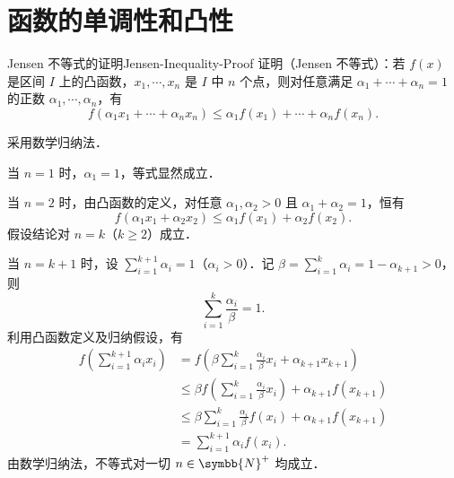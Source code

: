 \section{函数的单调性和凸性}

\begin{problem}{Jensen 不等式的证明}{Jensen-Inequality-Proof}
    证明（Jensen 不等式）：若 $f(x)$ 是区间 $I$ 上的凸函数，$x_1, \cdots, x_n$ 是 $I$ 中 $n$ 个点，则对任意满足 $\alpha_1 + \cdots + \alpha_n = 1$ 的正数 $\alpha_1, \cdots, \alpha_n$，有
    \begin{equation}
        f(\alpha_1 x_1 + \cdots + \alpha_n x_n) \leqslant \alpha_1 f(x_1) + \cdots + \alpha_n f(x_n).
    \end{equation}
\end{problem}

\begin{myproof}
    采用数学归纳法．

    当 $n = 1$ 时，$\alpha_1 = 1$，等式显然成立．

    当 $n = 2$ 时，由凸函数的定义，对任意 $\alpha_1, \alpha_2 > 0$ 且 $\alpha_1 + \alpha_2 = 1$，恒有
    \begin{equation}
        f(\alpha_1 x_1 + \alpha_2 x_2) \leqslant \alpha_1 f(x_1) + \alpha_2 f(x_2).
    \end{equation}
    假设结论对 $n = k$（$k \geqslant 2$）成立．

    当 $n = k + 1$ 时，设 $\sum_{i=1}^{k+1} \alpha_i = 1$（$\alpha_i > 0$）．记 $\beta = \sum_{i=1}^k \alpha_i = 1 - \alpha_{k+1} > 0$，则
    \begin{equation}
        \sum_{i=1}^k \frac{\alpha_i}{\beta} = 1.
    \end{equation}
    利用凸函数定义及归纳假设，有
    \begin{equation}
        \begin{aligned}
            f\left( \sum_{i=1}^{k+1} \alpha_i x_i \right) & = f\left( \beta \sum_{i=1}^k \frac{\alpha_i}{\beta} x_i + \alpha_{k+1} x_{k+1} \right)            \\
                                                          & \leqslant \beta f\left( \sum_{i=1}^k \frac{\alpha_i}{\beta} x_i \right) + \alpha_{k+1} f(x_{k+1}) \\
                                                          & \leqslant \beta \sum_{i=1}^k \frac{\alpha_i}{\beta} f(x_i) + \alpha_{k+1} f(x_{k+1})              \\
                                                          & = \sum_{i=1}^{k+1} \alpha_i f(x_i).
        \end{aligned}
    \end{equation}
    由数学归纳法，不等式对一切 $n \in \symbb{N}^+$ 均成立．
\end{myproof}

